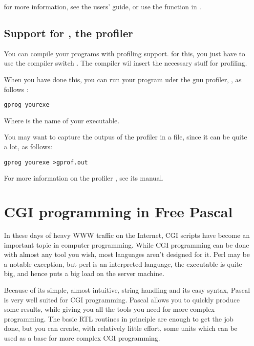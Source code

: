 \documentclass{report}
\begin{document}
for more information, see the  users' guide, or use the 
function in .


\section{Support for , the \gnu profiler}
\label{se:gprof}

You can compile your programs with profiling support. for this, you just
have to use the compiler switch . The compiler wil insert the
necessary stuff for profiling. 

When you have done this, you can run your program uder the gnu profiler,
, as follows :
\begin{verbatim}
gprog yourexe
\end{verbatim}
Where  is the name of your executable.

You may want to capture the outpus of the profiler in a file, since it can
be quite a lot, as follows:
\begin{verbatim}
gprog yourexe >gprof.out
\end{verbatim}

For more information on the \gnu profiler , see its manual.


\chapter{CGI programming in Free Pascal}
\label{ch:CGIProgramming}

In these days of heavy WWW traffic on the Internet, CGI scripts have become
an important topic in computer programming. While CGI programming can be
done with almost any tool you wish, most languages aren't designed for it.
Perl may be a notable exception, but perl is an interpreted language, the
executable is quite big, and hence puts a big load on the server machine.

Because of its simple, almost intuitive, string handling and its easy syntax, 
Pascal is very well suited for CGI programming. Pascal allows you to quickly
produce some results, while giving you all the tools you need for more
complex programming. The basic RTL routines in principle are enough to get
the job done, but you can create, with relatively little effort, some units
which can be used as a base for more complex CGI programming.
\end{document}
